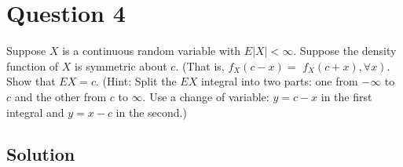 \section*{Question 4}

Suppose \( X \) is a continuous random variable with \( E|X|<\infty \).
Suppose the density function of \( X \) is symmetric about \( c \).
(That is, \( f_{X}(c-x)= \) \( \left.f_{X}(c+x), \forall x\right) \).
Show that \( E X=c \).
(Hint: Split the \( E X \) integral into two parts: one from \( -\infty \) to \( c \) and the other from \( c \) to \( \infty \).
Use a change of variable: \( y=c-x \) in the first integral and \( y=x-c \) in the second.)

\subsection*{Solution}
